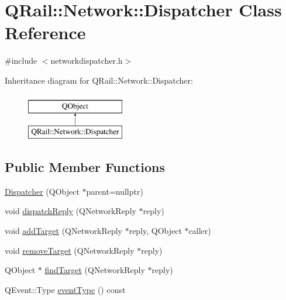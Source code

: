 \hypertarget{classQRail_1_1Network_1_1Dispatcher}{}\section{Q\+Rail\+::Network\+::Dispatcher Class Reference}
\label{classQRail_1_1Network_1_1Dispatcher}


{\ttfamily \#include $<$networkdispatcher.\+h$>$}

Inheritance diagram for Q\+Rail\+::Network\+::Dispatcher\+:\begin{figure}[H]
\begin{center}
\leavevmode
\includegraphics[height=2.000000cm]{classQRail_1_1Network_1_1Dispatcher}
\end{center}
\end{figure}
\subsection*{Public Member Functions}
\begin{DoxyCompactItemize}
\item 
\mbox{\hyperlink{classQRail_1_1Network_1_1Dispatcher_a4b34af3aa56d23755418821f1fc99a29}{Dispatcher}} (Q\+Object $\ast$parent=nullptr)
\item 
void \mbox{\hyperlink{classQRail_1_1Network_1_1Dispatcher_a2b9513eed3f30a28947a5cca87a667d4}{dispatch\+Reply}} (Q\+Network\+Reply $\ast$reply)
\item 
void \mbox{\hyperlink{classQRail_1_1Network_1_1Dispatcher_a608a8218cae5952ba46aec92d5bc5341}{add\+Target}} (Q\+Network\+Reply $\ast$reply, Q\+Object $\ast$caller)
\item 
void \mbox{\hyperlink{classQRail_1_1Network_1_1Dispatcher_a5733f3e85bac53d7c480787ba8d0a350}{remove\+Target}} (Q\+Network\+Reply $\ast$reply)
\item 
Q\+Object $\ast$ \mbox{\hyperlink{classQRail_1_1Network_1_1Dispatcher_afc4be4bc2b68eb5bc9e307120462c280}{find\+Target}} (Q\+Network\+Reply $\ast$reply)
\item 
Q\+Event\+::\+Type \mbox{\hyperlink{classQRail_1_1Network_1_1Dispatcher_a543add8c9e2850b0de01848a9b22fa10}{event\+Type}} () const
\end{DoxyCompactItemize}


